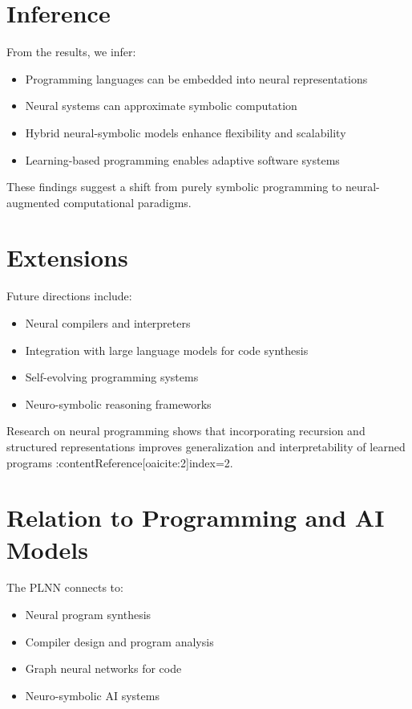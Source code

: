 \documentclass[12pt]{article}
\begin{document}
\section{Inference}

From the results, we infer:

\begin{itemize}
\item Programming languages can be embedded into neural representations
\item Neural systems can approximate symbolic computation
\item Hybrid neural-symbolic models enhance flexibility and scalability
\item Learning-based programming enables adaptive software systems
\end{itemize}

These findings suggest a shift from purely symbolic programming to neural-augmented computational paradigms.

\section{Extensions}

Future directions include:

\begin{itemize}
\item Neural compilers and interpreters
\item Integration with large language models for code synthesis
\item Self-evolving programming systems
\item Neuro-symbolic reasoning frameworks
\end{itemize}

Research on neural programming shows that incorporating recursion and structured representations improves generalization and interpretability of learned programs :contentReference[oaicite:2]{index=2}.

\section{Relation to Programming and AI Models}

The PLNN connects to:

\begin{itemize}
\item Neural program synthesis
\item Compiler design and program analysis
\item Graph neural networks for code
\item Neuro-symbolic AI systems
\end{itemize}
\end{document}

